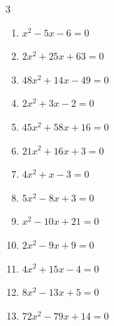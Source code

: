 \begin{multicols}{3}
\begin{enumerate}

  \item $x^{2}-5x-6=0$

        \phantom{$\displaystyle x=-1,\; 6$}

  \item $2x^{2}+25x+63=0$


  \item $48x^{2}+14x-49=0$


  \item $2x^{2}+3x-2=0$


  \item $45x^{2}+58x+16=0$


  \item $21x^{2}+16x+3=0$


  \item $4x^{2}+x-3=0$


  \item $5x^{2}-8x+3=0$


\columnbreak %

  \item $x^{2}-10x+21=0$

        \phantom{$\displaystyle x=7,\; 3$}

  \item $2x^{2}-9x+9=0$


  \item $4x^{2}+15x-4=0$


  \item $8x^{2}-13x+5=0$


  \item $72x^{2}-79x+14=0$


\end{enumerate}
\end{multicols}
